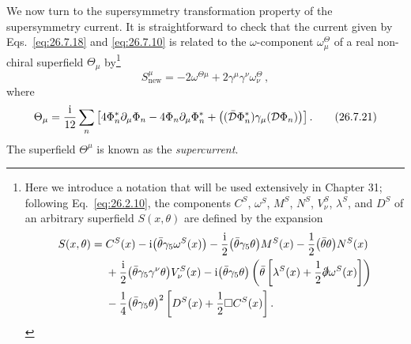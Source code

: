 We now turn to the supersymmetry transformation property of the
supersymmetry current. It is straightforward to check that the current given
by Eqs.~\eqref{eq:26.7.18} and \eqref{eq:26.7.10} is related to the
\(\omega\)-component \(\omega_\mu^\Theta\) of a real non-chiral superfield
\(\Theta_\mu\) by\footnote{Here we introduce a notation that will be used
extensively in Chapter 31; following Eq.~\eqref{eq:26.2.10}, the components
\(C^S\), \(\omega^S\), \(M^S\), \(N^S\), \(V_\nu^S\), \(\lambda^S\), and
\(D^S\) of an arbitrary superfield \(S(x,\theta)\) are defined by the
expansion
\[
  \begin{aligned}
  S(x,\theta)={}&C^S(x)-\mathrm{i}\bigl(\bar\theta\gamma_5\omega^S(x)\bigr)
  -\frac{\mathrm{i}}{2}\bigl(\bar\theta\gamma_5\theta\bigr)M^S(x)
  -\frac12\bigl(\bar\theta\theta\bigr)N^S(x)
  \\
  &+\frac{\mathrm{i}}{2}\bigl(\bar\theta\gamma_5\gamma^\nu\theta\bigr)V_\nu^S(x)
  -\mathrm{i}\bigl(\bar\theta\gamma_5\theta\bigr)
   \left(
    \bar\theta\left[\lambda^S(x)+\frac12\slashed{\partial}\omega^S(x)\right]
   \right)
  \\
  &-\frac14\bigl(\bar\theta\gamma_5\theta\bigr)^2
   \left[D^S(x)+\frac12\Box C^S(x)\right].
  \end{aligned}
\]}
\begin{equation}
  S_{\mathrm{new}}^\mu
  =-2\omega^{\Theta\mu}
   +2\gamma^\mu\gamma^\nu\omega_\nu^\Theta\,,
  \tag{26.7.20}\label{eq:26.7.20}
\end{equation}
where
\begin{equation}
  \Theta_\mu
  =\frac{\mathrm{i}}{12}\sum_n\left[
    4\Phi_n^*\partial_\mu\Phi_n
    -4\Phi_n\partial_\mu\Phi_n^*
    +\bigl((\bar{\mathcal{D}}\Phi_n^*)\gamma_\mu(\mathcal{D}\Phi_n)\bigr)
  \right].
  \tag{26.7.21}\label{eq:26.7.21}
\end{equation}
The superfield \(\Theta^\mu\) is known as the \emph{supercurrent}.

